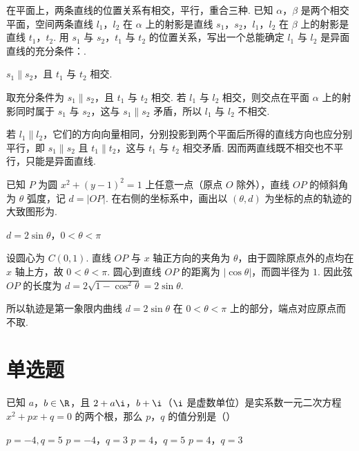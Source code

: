 \begin{problem}
在平面上，两条直线的位置关系有相交，平行，重合三种. 已知 \(\alpha\)，\(\beta\) 是两个相交平面，空间两条直线 \(l_{1}\)，\(l_{2}\) 在 \(\alpha\) 上的射影是直线 \(s_{1}\)，\(s_{2}\)，\(l_{1}\)，\(l_{2}\) 在 \(\beta\) 上的射影是直线 \(t_{1}\)，\(t_{2}\). 用 \(s_{1}\) 与 \(s_{2}\)，\(t_{1}\) 与 \(t_{2}\) 的位置关系，写出一个总能确定 \(l_{1}\) 与 \(l_{2}\) 是异面直线的充分条件：\fillinblank{}.
\end{problem}

\begin{answer}
\(s_{1}\parallel s_{2}\)，且 \(t_{1}\) 与 \(t_{2}\) 相交.
\end{answer}

\begin{solution}
取充分条件为 \(s_{1}\parallel s_{2}\)，且 \(t_{1}\) 与 \(t_{2}\) 相交. 若 \(l_1\) 与 \(l_2\) 相交，则交点在平面 \(\alpha\) 上的射影同时属于 \(s_1\) 与 \(s_2\)，这与 \(s_1\parallel s_2\) 矛盾，所以 \(l_1\) 与 \(l_2\) 不相交.

若 \(l_1\parallel l_2\)，它们的方向向量相同，分别投影到两个平面后所得的直线方向也应分别平行，即 \(s_1\parallel s_2\) 且 \(t_1\parallel t_2\)，这与 \(t_1\) 与 \(t_2\) 相交矛盾. 因而两直线既不相交也不平行，只能是异面直线.
\end{solution}

\begin{problem}
已知 \(P\) 为圆 \(x^{2} + (y - 1)^{2} = 1\) 上任意一点（原点 \(O\) 除外），直线 \(OP\) 的倾斜角为 \(\theta\) 弧度，记 \(d = |OP|\). 在右侧的坐标系中，画出以 \((\theta, d)\) 为坐标的点的轨迹的大致图形为\fillinblank{}.

\end{problem}

\begin{answer}
\(d=2\sin\theta\)，\(0<\theta<\pi\)
\end{answer}

\begin{solution}
设圆心为 \(C(0,1)\). 直线 \(OP\) 与 \(x\) 轴正方向的夹角为 \(\theta\)，由于圆除原点外的点均在 \(x\) 轴上方，故 \(0<\theta<\pi\). 圆心到直线 \(OP\) 的距离为 \(|\cos\theta|\)，而圆半径为 \(1\). 因此弦 \(OP\) 的长度为 \(d=2\sqrt{1-\cos^2\theta}=2\sin\theta\).

所以轨迹是第一象限内曲线 \(d=2\sin\theta\) 在 \(0<\theta<\pi\) 上的部分，端点对应原点而不取.
\end{solution}

\section{单选题}
\begin{problem}
已知 \(a\)，\(b \in \R\)，且 \(2 + a\i\)，\(b + \i\)（\(\i\) 是虚数单位）是实系数一元二次方程 \(x^{2} + px + q = 0\) 的两个根，那么 \(p\)，\(q\) 的值分别是（\quad）

\choices
    {\(p = -4, q = 5\)}
    {\(p = -4\)，\(q = 3\)}
    {\(p = 4\)，\(q = 5\)}
    {\(p = 4\)，\(q = 3\)}
\end{problem}


